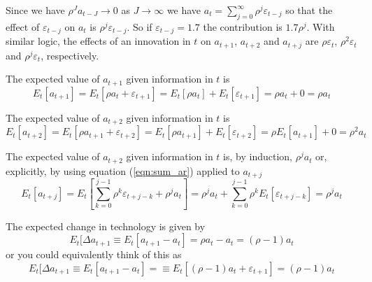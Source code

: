 \documentclass[authoryear,11pt]{elsarticle}
\begin{document}
Since we have $\rho^{J}a_{t-J} \to 0$ as $J \to \infty$ we have $a_{t} = \sum\limits_{j=0}^{\infty} \rho^{j} \varepsilon_{t-j}$ so that the effect of $\varepsilon_{t-j}$ on $a_{t}$ is $\rho^{j} \varepsilon_{t-j}$. So if $\varepsilon_{t-j}=1.7$ the contribution is $1.7\rho^{j}$. With similar logic, the effects of an innovation in $t$ on $a_{t+1}$, $a_{t+2}$ and $a_{t+j}$ are $\rho \varepsilon_{t}$, $\rho^{2} \varepsilon_{t}$ and $\rho^{j} \varepsilon_{t}$, respectively.

The expected value of $a_{t+1}$ given information in $t$ is
\[
E_{t}[a_{t+1}] = E_{t} [ \rho a_{t} + \varepsilon_{t+1} ] = E_{t} [ \rho a_{t} ] + E_{t}[ \varepsilon_{t+1} ] = \rho a_{t}  + 0 = \rho a_{t}
\]

The expected value of $a_{t+2}$ given information in $t$ is
\[
E_{t}[a_{t+2}] = E_{t} [ \rho a_{t+1} + \varepsilon_{t+2} ] = E_{t} [ \rho a_{t+1} ] + E_{t}[ \varepsilon_{t+2} ] = \rho E_{t}[a_{t+1}]  + 0 = \rho^2 a_{t}
\]

The expected value of $a_{t+2}$ given information in $t$ is, by induction, $\rho^{j} a_{t}$ or, explicitly, by using equation (\ref{eqn:sum_ar}) applied to $a_{t+j}$
\[
E_{t}[a_{t+j}] = E_{t}[ \sum\limits_{k=0}^{j-1} \rho^{k} \varepsilon_{t+j-k} + \rho^{j} a_{t} ] = \rho^{j} a_{t} + \sum\limits_{k=0}^{j-1} \rho^{k} E_{t}[\varepsilon_{t+j-k}] =  \rho^{j} a_{t}
\]

The expected change in technology is given by
\[
E_{t}[\Delta a_{t+1} \equiv E_{t}[ a_{t+1} - a_{t}] = \rho a_{t} - a_{t} = (\rho - 1) a_{t}
\]
or you could equivalently think of this as
\[
E_{t}[\Delta a_{t+1} \equiv E_{t}[ a_{t+1} - a_{t}] =  \equiv E_{t}[ (\rho-1) a_{t} + \varepsilon_{t+1}] = (\rho - 1) a_{t}
\]
\end{document}
